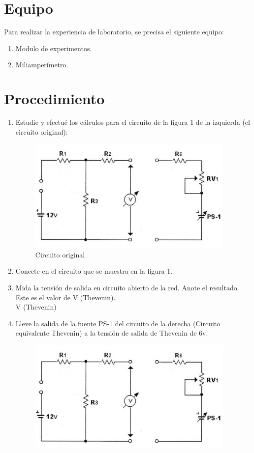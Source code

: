 \section{Equipo}
Para realizar la experiencia de laboratorio, se precisa el siguiente equipo:
\begin{enumerate}
	\item Modulo de experimentos.
	\item Miliamperímetro.
\end{enumerate}
\section{Procedimiento}
\begin{enumerate}
	\item Estudie y efectué los cálculos para el circuito de la figura 1 de la izquierda (el circuito original):
	\\
	\begin{figure}[h]
		\centering
		\includegraphics[scale=1]{imagenes/4.1}
		\caption{Circuito original}
	\end{figure}
	\item Conecte en el circuito que se muestra en la figura 1.
	\item Mida la tensión de salida en circuito abierto de la red. Anote el resultado. Este es el valor de V (Thevenin).
	\\ V (Thevenin)
	\item Lleve la salida de la fuente PS-1 del circuito de la derecha (Circuito equivalente Thevenin) a la tensión de salida de Thevenin de 6v.
	\begin{figure}[h]
		\centering
		\includegraphics[scale=1]{imagenes/4.1}

\end{figure}
\end{enumerate}
